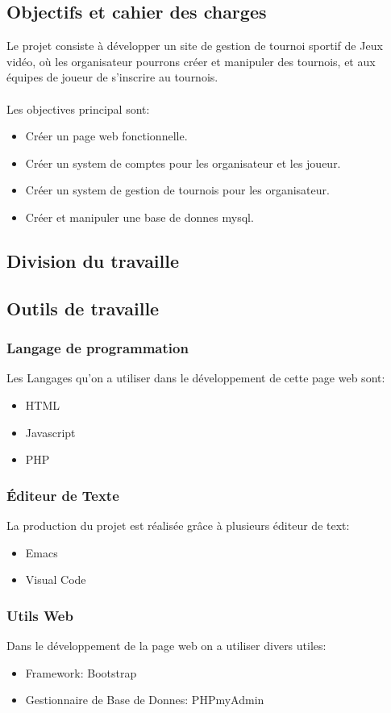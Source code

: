 \documentclass{article}
\begin{document}
\subsection{Objectifs et cahier des charges}
Le projet consiste à développer un site de gestion de tournoi sportif de Jeux vidéo, où les organisateur pourrons créer et manipuler des tournois, et aux équipes de joueur de s’inscrire au tournois.\\~\\
Les objectives principal sont:
\begin{itemize}
\item Créer un page web fonctionnelle.
\item Créer un system de comptes pour les organisateur et les joueur.
\item Créer un system de gestion de tournois pour les organisateur.
\item Créer et manipuler une base de donnes mysql.
\end{itemize}
\subsection{Division du travaille}
\subsection{Outils de travaille}
\subsubsection{Langage de programmation}
Les Langages qu'on a utiliser dans le développement de cette page web sont:
\begin{itemize}
\item HTML
\item Javascript
\item PHP
\end{itemize}
\subsubsection{Éditeur de Texte}
La production du projet est réalisée grâce à plusieurs éditeur de text:
\begin{itemize}
\item Emacs
\item Visual Code
\end{itemize}
\subsubsection{Utils Web}
Dans le développement de la page web on a utiliser divers utiles:
\begin{itemize}
\item Framework: Bootstrap
\item Gestionnaire de Base de Donnes: PHPmyAdmin
\end{itemize}
\end{document}
